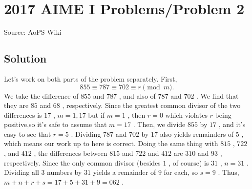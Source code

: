 \documentclass[12pt]{article}
\begin{document}
\section*{{2017 AIME I Problems/Problem 2}}
Source: AoPS Wiki

\subsection*{Solution}
Let's work on both parts of the problem separately. First, \[855 \equiv 787 \equiv 702 \equiv r \pmod{m}.\] We take the difference of $855$ and $787$ , and also of $787$ and $702$ . We find that they are $85$ and $68$ , respectively. Since the greatest common divisor of the two differences is $17$ , $m=1,17$ but if $m=1$ , then $r=0$ which violates $r$ being positive,so it's safe to assume that $m = 17$ . Then, we divide $855$ by $17$ , and it's easy to see that $r = 5$ . Dividing $787$ and $702$ by $17$ also yields remainders of $5$ , which means our work up to here is correct. Doing the same thing with $815$ , $722$ , and $412$ , the differences between $815$ and $722$ and $412$ are $310$ and $93$ , respectively. Since the only common divisor (besides $1$ , of course) is $31$ , $n = 31$ . Dividing all $3$ numbers by $31$ yields a remainder of $9$ for each, so $s = 9$ . Thus, $m + n + r + s = 17 + 5 + 31 + 9 = \boxed{062}$ .
\end{document}
